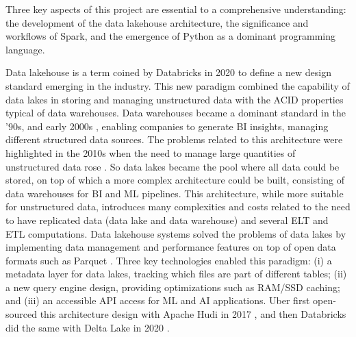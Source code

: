 Three key aspects of this project are essential to a comprehensive understanding: the development of the data lakehouse architecture, the significance and workflows of Spark, and the emergence of Python as a dominant programming language.

Data lakehouse is a term coined by Databricks in 2020 \cite{WhatLakehouse2020} to define a new design standard emerging in the industry. This new paradigm combined the capability of data lakes in storing and managing unstructured data with the \gls{ACID} properties typical of data warehouses.
Data warehouses became a dominant standard in the '90s, and early 2000s \cite{chaudhuriOverviewDataWarehousing1997}, enabling companies to generate \gls{BI} insights, managing different structured data sources. The problems related to this architecture were highlighted in the 2010s when the need to manage large quantities of unstructured data rose \cite{ederUnstructuredData802008}. 
So data lakes became the pool where all data could be stored, on top of which a more complex architecture could be built, consisting of data warehouses for \gls{BI} and \gls{ML} pipelines.
This architecture, while more suitable for unstructured data, introduces many complexities and costs related to the need to have replicated data (data lake and data warehouse) and several \gls{ELT} and \gls{ETL} computations.
Data lakehouse systems solved the problems of data lakes by implementing data management and performance features on top of open data formats such as Parquet \cite{DremelMadeSimple}. Three key technologies enabled this paradigm: (i) a metadata layer for data lakes, tracking which files are part of different tables; (ii) a new query engine design, providing optimizations such as \gls{RAM}/\gls{SSD} caching; and (iii) an accessible \gls{API} access for \gls{ML} and \gls{AI} applications. Uber first open-sourced this architecture design with Apache Hudi in 2017 \cite{rajaperumalUberEngineeringIncremental2017}, and then Databricks did the same with Delta Lake in 2020 \cite{armbrustDeltaLakeHighperformance2020}.

